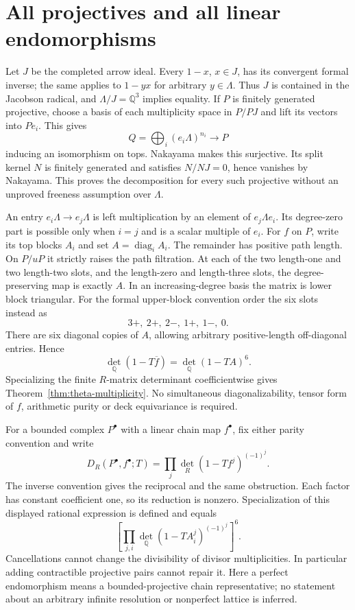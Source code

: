 \section{All projectives and all linear endomorphisms}
Let $J$ be the completed arrow ideal. Every $1-x$, $x\in J$, has its convergent formal inverse; the same applies to $1-yx$ for arbitrary $y\in\Lambda$. Thus $J$ is contained in the Jacobson radical, and $\Lambda/J=\mathbb Q^3$ implies equality. If $P$ is finitely generated projective, choose a basis of each multiplicity space in $P/PJ$ and lift its vectors into $Pe_i$. This gives
\[
 Q=\bigoplus_i(e_i\Lambda)^{n_i}\longrightarrow P
\]
inducing an isomorphism on tops. Nakayama makes this surjective. Its split kernel $N$ is finitely generated and satisfies $N/NJ=0$, hence vanishes by Nakayama. This proves the decomposition for every such projective without an unproved freeness assumption over $\Lambda$.

An entry $e_i\Lambda\to e_j\Lambda$ is left multiplication by an element of $e_j\Lambda e_i$. Its degree-zero part is possible only when $i=j$ and is a scalar multiple of $e_i$. For $f$ on $P$, write its top blocks $A_i$ and set $A=\operatorname{diag}_iA_i$. The remainder has positive path length. On $P/uP$ it strictly raises the path filtration. At each of the two length-one and two length-two slots, and the length-zero and length-three slots, the degree-preserving map is exactly $A$. In an increasing-degree basis the matrix is lower block triangular. For the formal upper-block convention order the six slots instead as
\[
 3+,\ 2+,\ 2-,\ 1+,\ 1-,\ 0.
\]
There are six diagonal copies of $A$, allowing arbitrary positive-length off-diagonal entries. Hence
\[
 \det_{\mathbb Q}(1-T\overline f)=\det_{\mathbb Q}(1-TA)^6.
\]
Specializing the finite $R$-matrix determinant coefficientwise gives Theorem~\ref{thm:theta-multiplicity}. No simultaneous diagonalizability, tensor form of $f$, arithmetic purity or deck equivariance is required.

For a bounded complex $P^\bullet$ with a linear chain map $f^\bullet$, fix either parity convention and write
\[
 D_R(P^\bullet,f^\bullet;T)=\prod_j\det_R(1-Tf^j)^{(-1)^j}.
\]
The inverse convention gives the reciprocal and the same obstruction. Each factor has constant coefficient one, so its reduction is nonzero. Specialization of this displayed rational expression is defined and equals
\[
 \left[\prod_{j,i}\det_{\mathbb Q}(1-TA_i^j)^{(-1)^j}\right]^6.
\]
Cancellations cannot change the divisibility of divisor multiplicities. In particular adding contractible projective pairs cannot repair it. Here a perfect endomorphism means a bounded-projective chain representative; no statement about an arbitrary infinite resolution or nonperfect lattice is inferred.

